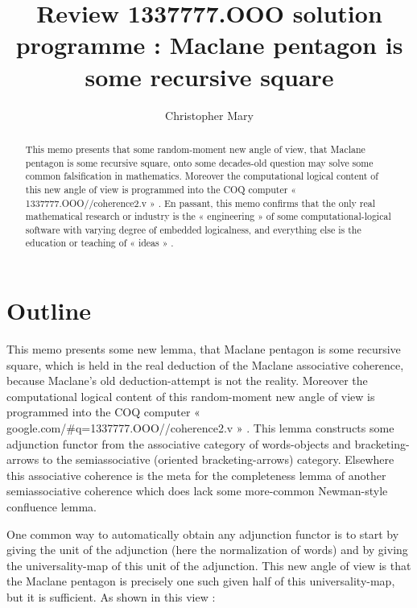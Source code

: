 \documentclass{llncs}
\institute{1337777.OOO}
\author{Christopher Mary}
\date{}
\title{Review 1337777.OOO solution programme : Maclane pentagon is some recursive square}
\begin{document}
\maketitle
\begin{abstract}
This memo presents that some random-moment new angle of view, that
Maclane pentagon is some recursive square, onto some decades-old
question may solve some common falsification in mathematics. Moreover
the computational logical content of this new angle of view is
programmed into the COQ computer « 1337777.OOO//coherence2.v » . En
passant, this memo confirms that the only real mathematical research
or industry is the « engineering » of some computational-logical
software with varying degree of embedded logicalness, and everything
else is the education or teaching of « ideas » .
\end{abstract}

\section{Outline}
\label{sec:org0b05bf5}

This memo presents some new lemma, that Maclane pentagon is some
recursive square, which is held in the real deduction of the Maclane
associative coherence, because Maclane's old deduction-attempt is not
the reality. Moreover the computational logical content of this
random-moment new angle of view is programmed into the COQ computer «
google.com/\#q=1337777.OOO//coherence2.v » . This lemma constructs some
adjunction functor from the associative category of words-objects and
bracketing-arrows to the semiassociative (oriented bracketing-arrows)
category. Elsewhere this associative coherence is the meta for the
completeness lemma of another semiassociative coherence which does
lack some more-common Newman-style confluence lemma.

One common way to automatically obtain any adjunction functor is to
start by giving the unit of the adjunction (here the normalization of
words) and by giving the universality-map of this unit of the
adjunction. This new angle of view is that the Maclane pentagon is
precisely one such given half of this universality-map, but it is
sufficient.  As shown in this view :
\end{document}
